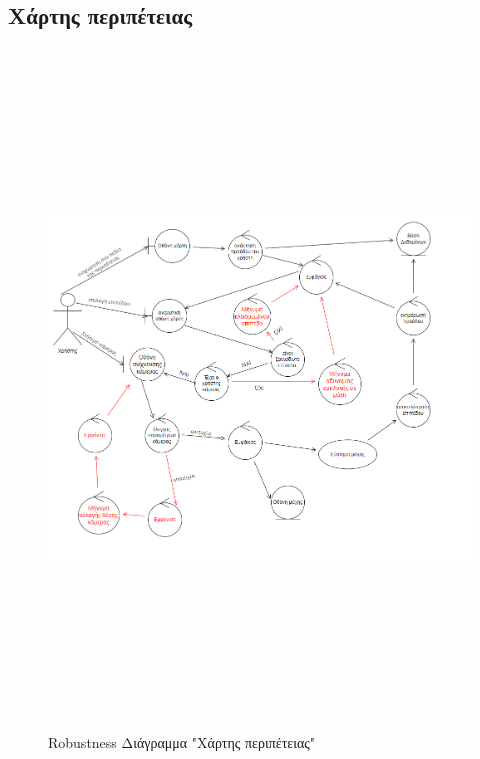 \subsection{Χάρτης περιπέτειας}
\begin{figure}[!htb]
  \begin{center}
    \includegraphics[width=18cm,height=18cm]{robust_map.png}
    \caption{Robustness Διάγραμμα "Χάρτης περιπέτειας"}
    \label{}
     \end{center}
\end{figure}
\newpage


